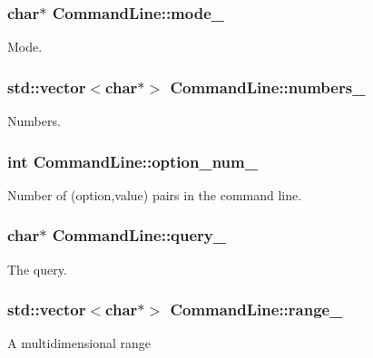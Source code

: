 \subsubsection[{mode\+\_\+}]{\setlength{\rightskip}{0pt plus 5cm}char$\ast$ Command\+Line\+::mode\+\_\+}\label{classCommandLine_a584f279447430b2da687a3d5687c4d7e}
Mode. \hypertarget{classCommandLine_a75a014324b812198360edc99ad4e84b6}{}
\subsubsection[{numbers\+\_\+}]{\setlength{\rightskip}{0pt plus 5cm}std\+::vector$<$char$\ast$$>$ Command\+Line\+::numbers\+\_\+}\label{classCommandLine_a75a014324b812198360edc99ad4e84b6}
Numbers. \hypertarget{classCommandLine_a63edf2445a1152f2989ac28b1a64f475}{}
\subsubsection[{option\+\_\+num\+\_\+}]{\setlength{\rightskip}{0pt plus 5cm}int Command\+Line\+::option\+\_\+num\+\_\+}\label{classCommandLine_a63edf2445a1152f2989ac28b1a64f475}
Number of (option,value) pairs in the command line. \hypertarget{classCommandLine_ab3a511c590a3202c4629d7770eb08dee}{}
\subsubsection[{query\+\_\+}]{\setlength{\rightskip}{0pt plus 5cm}char$\ast$ Command\+Line\+::query\+\_\+}\label{classCommandLine_ab3a511c590a3202c4629d7770eb08dee}
The query. \hypertarget{classCommandLine_a2df474de00bbcd25dfacacf28494220f}{}
\subsubsection[{range\+\_\+}]{\setlength{\rightskip}{0pt plus 5cm}std\+::vector$<$char$\ast$$>$ Command\+Line\+::range\+\_\+}\label{classCommandLine_a2df474de00bbcd25dfacacf28494220f}
A multidimensional range \hypertarget{classCommandLine_a86248cf2fea828b7be7c3e4a174e3794}{}
